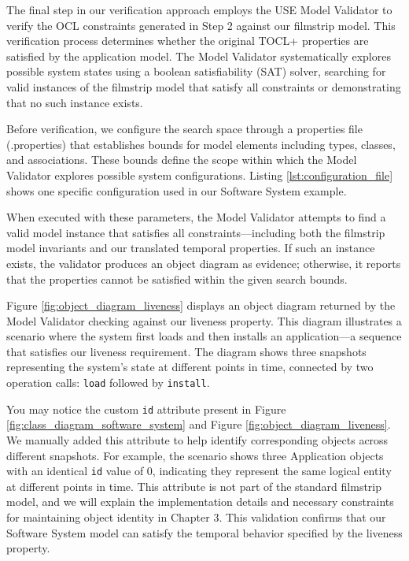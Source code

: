 \hspace{1cm} The final step in our verification approach employs the USE Model 
Validator \cite{USE_Validator} to verify the OCL constraints generated in Step 2 
against our filmstrip model. This verification process determines whether the 
original TOCL+ properties are satisfied by the application model. The Model Validator 
systematically explores possible system states using a boolean satisfiability (SAT) 
solver, searching for valid instances of the filmstrip model that satisfy all 
constraints or demonstrating that no such instance exists.

Before verification, we configure the search space through a properties file 
(.properties) that establishes bounds for model elements including types, classes, 
and associations. These bounds define the scope within which the Model Validator 
explores possible system configurations. Listing \ref{lst:configuration_file} shows 
one specific configuration used in our Software System example.

When executed with these parameters, the Model Validator attempts to find a valid 
model instance that satisfies all constraints—including both the filmstrip model 
invariants and our translated temporal properties. If such an instance exists, the 
validator produces an object diagram as evidence; otherwise, it reports that the 
properties cannot be satisfied within the given search bounds.

Figure \ref{fig:object_diagram_liveness} displays an object diagram returned by the 
Model Validator checking against our liveness property. This diagram illustrates a scenario where 
the system first loads and then installs an application—a sequence that satisfies our 
liveness requirement. The diagram shows three snapshots representing the system's 
state at different points in time, connected by two operation calls: \texttt{load} 
followed by \texttt{install}.

You may notice the custom \texttt{id} attribute present in Figure \ref{fig:class_diagram_software_system}
and Figure \ref{fig:object_diagram_liveness}. We manually added this attribute to help 
identify corresponding objects across different snapshots. For example, the scenario 
shows three Application objects with an identical \texttt{id} value of 0, indicating 
they represent the same logical entity at different points in time. This attribute 
is not part of the standard filmstrip model, and we will explain the implementation 
details and necessary constraints for maintaining object identity in Chapter 3. 
This validation confirms that our Software System model can satisfy the temporal 
behavior specified by the liveness property.



